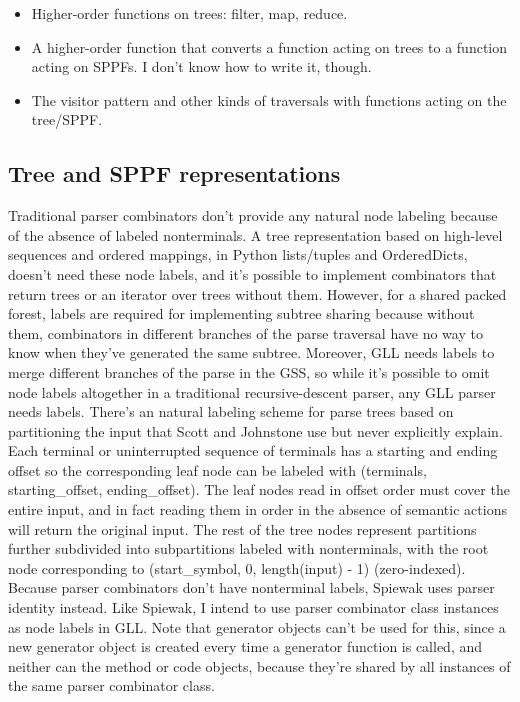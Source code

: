 \documentclass[12pt]{article}
\begin{document}
\begin{itemize}
\item Higher-order functions on trees: filter, map, reduce.
\item A higher-order function that converts a function acting on trees
  to a function acting on SPPFs.  I don't know how to write it, though.
\item The visitor pattern and other kinds of traversals with functions
  acting on the tree/SPPF.
\end{itemize}


\subsection{Tree and SPPF representations}
\label{sec:tree_sppf_representations}

Traditional parser combinators don't provide any natural node labeling
because of the absence of labeled nonterminals.  A tree representation
based on high-level sequences and ordered mappings, in Python
lists/tuples and OrderedDicts, doesn't need these node labels, and
it's possible to implement combinators that return trees or an
iterator over trees without them.  However, for a shared packed
forest, labels are required for implementing subtree sharing because
without them, combinators in different branches of the parse traversal
have no way to know when they've generated the same subtree.
Moreover, GLL needs labels to merge different branches of the parse in
the GSS, so while it's possible to omit node labels altogether in a
traditional recursive-descent parser, any GLL parser needs labels.
There's an natural labeling scheme for parse trees based on
partitioning the input that Scott and Johnstone use but never
explicitly explain.  Each terminal or uninterrupted sequence of
terminals has a starting and ending offset so the corresponding leaf
node can be labeled with (terminals, starting\_offset,
ending\_offset).  The leaf nodes read in offset order must cover the
entire input, and in fact reading them in order in the absence of
semantic actions will return the original input.  The rest of the tree
nodes represent partitions further subdivided into subpartitions
labeled with nonterminals, with the root node corresponding to
(start\_symbol, 0, length(input) - 1) (zero-indexed).  Because parser
combinators don't have nonterminal labels, Spiewak uses parser
identity instead.  Like Spiewak, I intend to use parser combinator
class instances as node labels in GLL.  Note that generator objects
can't be used for this, since a new generator object is created every
time a generator function is called, and neither can the method or
code objects, because they're shared by all instances of the same
parser combinator class.
\end{document}
